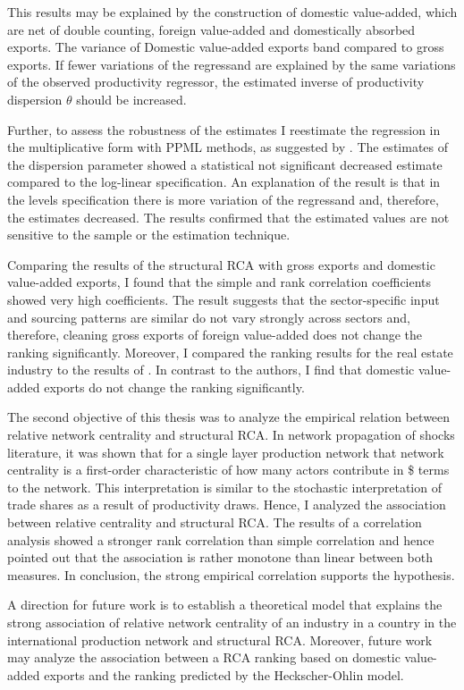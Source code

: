    This results may be explained by the construction of domestic value-added, which are net of double counting, foreign value-added and domestically absorbed exports.
   The variance of Domestic value-added exports band compared to gross exports.
   If fewer variations of the regressand are explained by the same variations of the observed productivity regressor, the estimated inverse of productivity dispersion $\theta$ should be increased.  \par
 Further, to assess the robustness of the estimates I reestimate the regression in the multiplicative form with PPML methods, as suggested by \textcite{silva}.
  The  estimates of the dispersion parameter showed a statistical not significant decreased estimate compared to the log-linear specification.
  An explanation of the result is that in the levels specification there is more variation of the regressand and, therefore, the estimates decreased.
  The results confirmed that the estimated values are not sensitive to the sample or the estimation technique. \par
Comparing the results of the structural RCA with gross exports and domestic value-added exports, I found that the simple and rank correlation coefficients showed very high coefficients.
The result suggests that the sector-specific input and sourcing patterns are similar do not vary strongly across sectors and, therefore, cleaning gross exports of foreign value-added does not change the ranking significantly.
Moreover, I compared the ranking results for the real estate industry to the results of \textcite{Koopman}.
In contrast to the authors, I find that domestic value-added exports do not change the ranking significantly. \par
 The second objective of this thesis was to analyze the empirical relation between relative network centrality and structural RCA.
 In network propagation of shocks literature, it was shown that for a single layer production network that network centrality is a first-order characteristic of how many actors contribute in \$ terms to the network.
 This interpretation is similar to the stochastic interpretation of trade shares as a result of productivity draws.
   Hence,  I  analyzed the association between relative centrality and structural RCA.
   The results of a correlation analysis showed a stronger rank correlation than simple correlation and hence pointed out that the association is rather monotone than linear between both measures.
   In conclusion, the strong empirical correlation supports the hypothesis. \par
  A direction for future work is to establish a theoretical model that explains the strong association of relative network centrality of an industry in a country in the international production network and structural RCA.
  Moreover, future work may analyze the association between a RCA ranking based on domestic value-added exports and the ranking predicted by the Heckscher-Ohlin model.
\endinput
